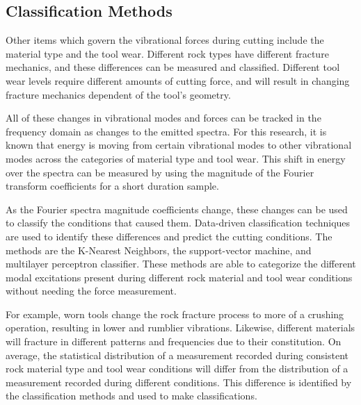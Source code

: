 \subsection{Classification Methods}

Other items which govern the vibrational forces during cutting include
the material type and the tool wear. 
Different rock types have different fracture mechanics, 
and these differences can be measured and classified.
Different tool wear levels require different amounts of cutting force,
and will result in changing fracture mechanics dependent of the tool's geometry.

All of these changes in vibrational modes and forces can be tracked in the
frequency domain as changes to the emitted spectra. For this research,
it is known that energy is moving from certain vibrational
modes to other vibrational modes across the categories of material type
and tool wear. This shift in energy over the spectra can be measured
by using the magnitude of the Fourier transform coefficients for a 
short duration sample.

As the Fourier spectra magnitude coefficients change, these changes 
can be used to classify the conditions that caused them.
Data-driven classification techniques are used to identify these differences and 
predict the cutting conditions.
The methods are the K-Nearest Neighbors, the support-vector machine, and multilayer perceptron classifier.
These methods are able to categorize the different modal excitations present during different rock material and tool wear
conditions without needing the force measurement. 

For example, worn tools change the rock fracture process
to more of a crushing operation, resulting in lower and rumblier vibrations. 
Likewise, different materials will fracture in different patterns and frequencies due to their constitution.
On average, the statistical distribution of a measurement recorded 
during consistent rock material type and tool wear conditions
will differ from the distribution of a measurement recorded during different conditions.
This difference is identified by the classification methods and used to make classifications.

